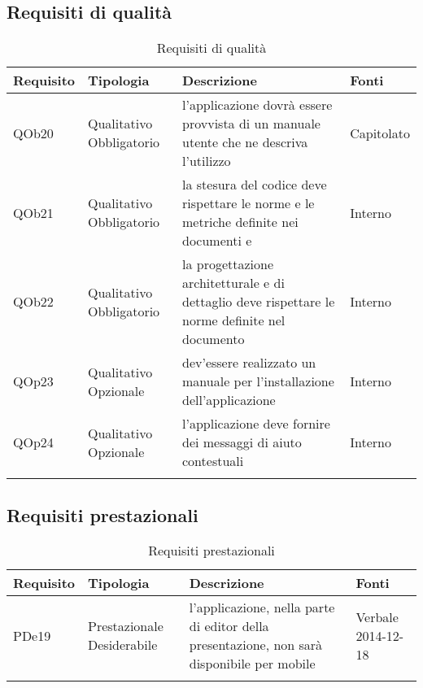 \subsection{ Requisiti di qualità}
	
\begin{longtable}{|l|p{2.5cm}|p{5cm}|p{3.5cm}|}
\hline
\textbf{Requisito} & \textbf{Tipologia} & \textbf{Descrizione} & \textbf{Fonti} \\
\hline
QOb20 & Qualitativo \linebreak Obbligatorio & l'applicazione dovrà essere provvista di un manuale utente che ne descriva l'utilizzo & Capitolato \linebreak \\
\hline
QOb21 & Qualitativo \linebreak Obbligatorio & la stesura del codice deve rispettare le norme e le metriche definite nei documenti \NdP{} e \PdQ{} & Interno \linebreak \\
\hline
QOb22 & Qualitativo \linebreak Obbligatorio & la progettazione architetturale e di dettaglio deve rispettare le norme definite nel documento \NdP{} & Interno \linebreak \\
\hline
QOp23 & Qualitativo \linebreak Opzionale & dev'essere realizzato un manuale per l'installazione dell'applicazione & Interno \linebreak \\
\hline
QOp24 & Qualitativo \linebreak Opzionale & l'applicazione deve fornire dei messaggi di aiuto contestuali & Interno \linebreak \\
\hline
\caption{Requisiti di qualità}
\end{longtable}
\subsection{ Requisiti prestazionali}
	
\begin{longtable}{|l|p{2.5cm}|p{5cm}|p{3.5cm}|}
\hline
\textbf{Requisito} & \textbf{Tipologia} & \textbf{Descrizione} & \textbf{Fonti} \\
\hline
PDe19 & Prestazionale \linebreak Desiderabile & l'applicazione, nella parte di editor della presentazione, non sarà disponibile per mobile & Verbale 2014-12-18 \linebreak \\
\hline
\caption{Requisiti prestazionali}
\end{longtable}
